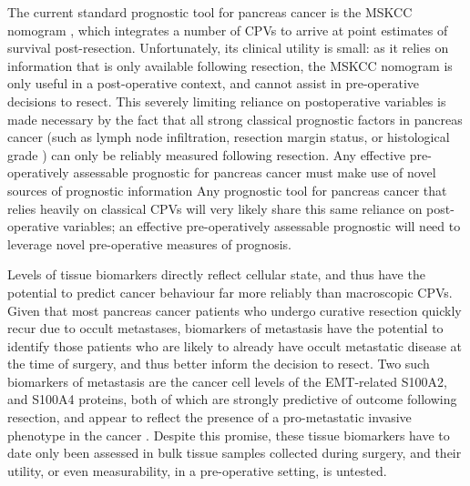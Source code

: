 \documentclass[dissertation.tex]{subfiles}
\begin{document}
The current standard prognostic tool for pancreas cancer is the \gls{MSKCC} nomogram \cite{Brennan2004}, which integrates a number of \glspl{CPV} to arrive at point estimates of survival post-resection.  Unfortunately, its clinical utility is small: as it relies on information that is only available following resection, the \gls{MSKCC} nomogram is only useful in a post-operative context, and cannot assist in pre-operative decisions to resect.  This severely limiting reliance on postoperative variables is made necessary by the fact that all strong classical prognostic factors in pancreas cancer (such as lymph node infiltration, resection margin status, or histological grade \cite{Bilici2014}) can only be reliably measured following resection.  Any effective pre-operatively assessable prognostic for pancreas cancer must make use of novel sources of prognostic information
Any prognostic tool for pancreas cancer that relies heavily on classical \glspl{CPV} will very likely share this same reliance on post-operative variables; an effective pre-operatively assessable prognostic will need to leverage novel pre-operative measures of prognosis.

Levels of tissue biomarkers directly reflect cellular state, and thus have the potential to predict cancer behaviour far more reliably than macroscopic \glspl{CPV}.  Given that most pancreas cancer patients who undergo curative resection quickly recur due to occult metastases, biomarkers of metastasis have the potential to identify those patients who are likely to already have occult metastatic disease at the time of surgery, and thus better inform the decision to resect.  Two such biomarkers of metastasis are the cancer cell levels of the \gls{EMT}-related S100A2, and S100A4 proteins, both of which are strongly predictive of outcome following resection, and appear to reflect the presence of a pro-metastatic invasive phenotype in the cancer \cite{Biankin2008, Tsukamoto2013, Lee2014}.  Despite this promise, these tissue biomarkers have to date only been assessed in bulk tissue samples collected during surgery, and their utility, or even measurability, in a pre-operative setting, is untested.
\end{document}
